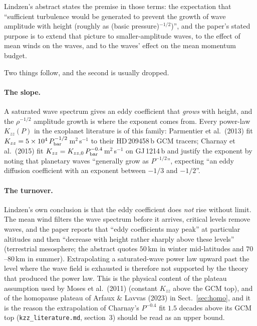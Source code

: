 \documentclass[english,a4paper]{my_memo}
\begin{document}
Lindzen's abstract states the premise in those terms: the expectation
that ``sufficient turbulence would be generated to prevent the growth of
wave amplitude with height (roughly as (basic pressure)$^{-1/2}$)'', and
the paper's stated purpose is to extend that picture to smaller-amplitude
waves, to the effect of mean winds on the waves, and to the waves' effect
on the mean momentum budget.

Two things follow, and the second is usually dropped.

\paragraph{The slope.} A saturated wave spectrum gives an eddy coefficient
that \emph{grows} with height, and the $\rho^{-1/2}$ amplitude growth is
where the exponent comes from. Every power-law $K_{zz}(P)$ in the exoplanet
literature is of this family: Parmentier et al.\ (2013) fit
$K_{zz} = 5\times10^{4}\,P_{\rm bar}^{-1/2}$\,m$^{2}$\,s$^{-1}$ to their
HD\,209458\,b GCM tracers; Charnay et al.\ (2015) fit
$K_{zz} = K_{zz,0}\,P_{\rm bar}^{-0.4}$\,m$^{2}$\,s$^{-1}$ on GJ\,1214\,b
and justify the exponent by noting that planetary waves ``generally grow as
$P^{-1/2}$'', expecting ``an eddy diffusion coefficient with an exponent
between $-1/3$ and $-1/2$''.

\paragraph{The turnover.} Lindzen's own conclusion is that the eddy
coefficient does \emph{not} rise without limit. The mean wind filters the
wave spectrum before it arrives, critical levels remove waves, and the paper
reports that ``eddy coefficients may peak'' at particular altitudes and
then ``decrease with height rather sharply above these levels'' (terrestrial
mesosphere; the abstract quotes $50$\,km in winter mid-latitudes and
$70$--$80$\,km in summer). Extrapolating a saturated-wave power law upward
past the level where the wave field is exhausted is therefore not supported
by the theory that produced the power law. This is the physical content of
the plateau assumption used by Moses et al.\ (2011) (constant $K_{zz}$
above the GCM top), and of the homopause plateau of Arfaux \& Lavvas
(2023) in Sect.~\ref{sec:homo}, and it is the reason the extrapolation of
Charnay's $P^{-0.4}$ fit $1.5$ decades above its GCM top
(\texttt{kzz\_literature.md}, section~3) should be read as an upper bound.
\end{document}
